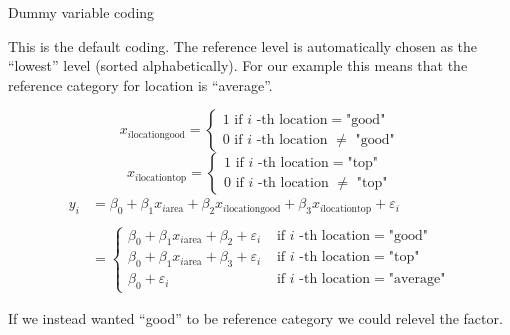 \documentclass[ignorenonframetext,]{beamer}
\begin{document}
\begin{frame}

\begin{block}{Dummy variable coding}

This is the default coding. The reference level is automatically chosen
as the ``lowest'' level (sorted alphabetically). For our example this
means that the reference category for location is ``average''.

\[x_{i \text{locationgood}} = \begin{cases} 1 \text{ if } i \text{ -th location}=\text{"good"} \\ 0 \text{ if } i \text{ -th location }\neq\text{ "good"} \end{cases}\]
\[x_{i \text{locationtop}} = \begin{cases} 1 \text{ if } i \text{ -th location}=\text{"top"} \\ 0 \text{ if } i \text{ -th location }\neq\text{ "top"} \end{cases}\]
\[\begin{aligned} y_i &= \beta_0 + \beta_1 x_{i \text{area}} + \beta_2 x_{i \text{locationgood}}+\beta_3 x_{i \text{locationtop}} + \varepsilon_i\\\\ &= \begin{cases} \beta_0 + \beta_1 x_{i \text{area}}+ \beta_2 + \varepsilon_i  &\text{ if } i \text{ -th location}=\text{"good"}  \\ \beta_0 + \beta_1 x_{i \text{area}}+ \beta_3 + \varepsilon_i &\text{ if } i \text{ -th location}=\text{"top"} \\ \beta_0 + \varepsilon_i &\text{ if } i \text{ -th location}=\text{"average"}\end{cases}\end{aligned}\]

If we instead wanted ``good'' to be reference category we could relevel
the factor.

\end{block}

\end{frame}
\end{document}
